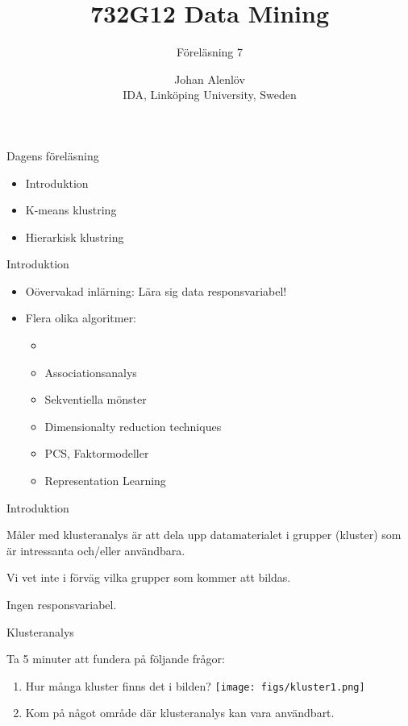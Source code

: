 \documentclass[10pt,english]{beamer}
\title{732G12 Data Mining}
\subtitle{Föreläsning 7}
\date{}
\author{Johan Alenlöv \\ IDA, Linköping University, Sweden}
\begin{document}
\maketitle

\begin{frame}{Dagens föreläsning}

    \begin{itemize}
        \item Introduktion
        \item K-means klustring
        \item Hierarkisk klustring
    \end{itemize}
    
\end{frame}

\begin{frame}{Introduktion}
    \begin{itemize}
        \item Oövervakad inlärning: Lära sig data  responsvariabel!
        \item Flera olika algoritmer:
        \begin{itemize}
            \item {}
            \item Associationsanalys
            \item Sekventiella mönster
            \item Dimensionalty reduction techniques
            \item PCS, Faktormodeller
            \item Representation Learning
        \end{itemize}
    \end{itemize}
\end{frame}

\begin{frame}{Introduktion}
    \begin{greenbox}
        Måler med klusteranalys är att dela upp datamaterialet i grupper (kluster) som är intressanta och/eller användbara.
    \end{greenbox}

    Vi vet inte i förväg vilka grupper som kommer att bildas.

    Ingen responsvariabel.
\end{frame}

\begin{frame}{Klusteranalys}

    Ta 5 minuter att fundera på följande frågor:

    \begin{enumerate}
        \item Hur många kluster finns det i bilden?
        \texttt{[image: figs/kluster1.png]}
        \item Kom på något område där klusteranalys kan vara användbart.
    \end{enumerate}
    
\end{frame}
\end{document}
